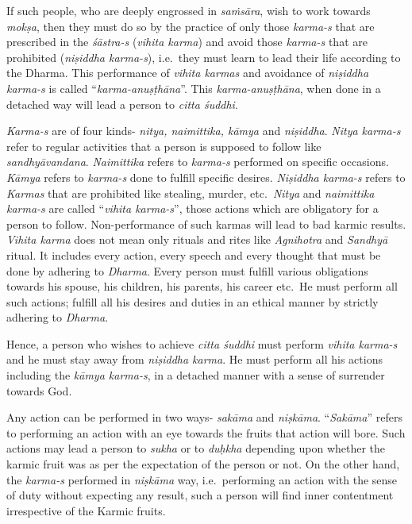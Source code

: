 If such people, who are deeply engrossed in \emph{saṁsāra}, wish to work towards \emph{mokṣa}, then they must do so by the practice of only those \emph{karma-s} that are prescribed in the \emph{śāstra-s} (\emph{vihita karma}) and avoid those \emph{karma-s} that are prohibited (\emph{niṣiddha karma-s}), i.e.\ they must learn to lead their life according to the Dharma. This performance of \emph{vihita karmas} and avoidance of \emph{niṣiddha karma-s} is called ``\emph{karma-anuṣṭhāna}''. This \emph{karma-anuṣṭhāna}, when done in a detached way will lead a person to \emph{citta śuddhi}.

\emph{Karma-s} are of four kinds- \emph{nitya, naimittika, kāmya} and \emph{niṣiddha}. \emph{Nitya karma-s} refer to regular activities that a person is supposed to follow like \emph{sandhyāvandana}. \emph{Naimittika} refers to \emph{karma-s} performed on specific occasions. \emph{Kāmya} refers to \emph{karma-s} done to fulfill specific desires. \emph{Niṣiddha karma-s} refers to \emph{Karmas} that are prohibited like stealing, murder, etc.\ \emph{Nitya} and \emph{naimittika} \emph{karma-s} are called ``\emph{vihita karma-s}'', those actions which are obligatory for a person to follow. Non-performance of such karmas will lead to bad karmic results. \emph{Vihita karma} does not mean only rituals and rites like \emph{Agnihotra} and \emph{Sandhyā} ritual. It includes every action, every speech and every thought that must be done by adhering to \emph{Dharma}. Every person must fulfill various obligations towards his spouse, his children, his parents, his career etc.\ He must perform all such actions; fulfill all his desires and duties in an ethical manner by strictly adhering to \emph{Dharma}.

Hence, a person who wishes to achieve \emph{citta śuddhi} must perform \emph{vihita karma-s} and he must stay away from \emph{niṣiddha karma}. He must perform all his actions including the \emph{kāmya karma-s}, in a detached manner with a sense of surrender towards God.

Any action can be performed in two ways- \emph{sakāma} and \emph{niṣkāma}. ``\emph{Sakāma}'' refers to performing an action with an eye towards the fruits that action will bore. Such actions may lead a person to \emph{sukha} or to \emph{duḥkha} depending upon whether the karmic fruit was as per the expectation of the person or not. On the other hand, the \emph{karma-s} performed in \emph{niṣkāma} way, i.e.\ performing an action with the sense of duty without expecting any result, such a person will find inner contentment irrespective of the Karmic fruits.


